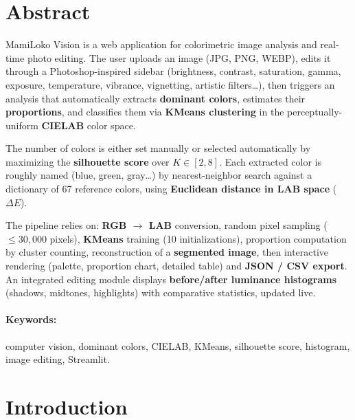 \documentclass[11pt,a4paper]{article}
\begin{document}
\section*{Abstract}

MamiLoko Vision is a web application for colorimetric image analysis and
real-time photo editing. The user uploads an image (JPG, PNG, WEBP), edits
it through a Photoshop-inspired sidebar (brightness, contrast, saturation,
gamma, exposure, temperature, vibrance, vignetting, artistic filters\ldots),
then triggers an analysis that automatically extracts \textbf{dominant
colors}, estimates their \textbf{proportions}, and classifies them via
\textbf{KMeans clustering} in the perceptually-uniform \textbf{CIELAB}
color space.

The number of colors is either set manually or selected automatically by
maximizing the \textbf{silhouette score} over $K \in [2, 8]$. Each
extracted color is roughly named (blue, green, gray\ldots) by
nearest-neighbor search against a dictionary of 67 reference colors, using
\textbf{Euclidean distance in LAB space} ($\Delta E$).

The pipeline relies on: \textbf{RGB $\rightarrow$ LAB} conversion, random
pixel sampling ($\leq 30{,}000$ pixels), \textbf{KMeans} training (10
initializations), proportion computation by cluster counting, reconstruction
of a \textbf{segmented image}, then interactive rendering (palette,
proportion chart, detailed table) and \textbf{JSON / CSV export}. An
integrated editing module displays \textbf{before/after luminance
histograms} (shadows, midtones, highlights) with comparative statistics,
updated live.

\paragraph{Keywords:} computer vision, dominant colors, CIELAB, KMeans,
silhouette score, histogram, image editing, Streamlit.

\section{Introduction}
\end{document}
